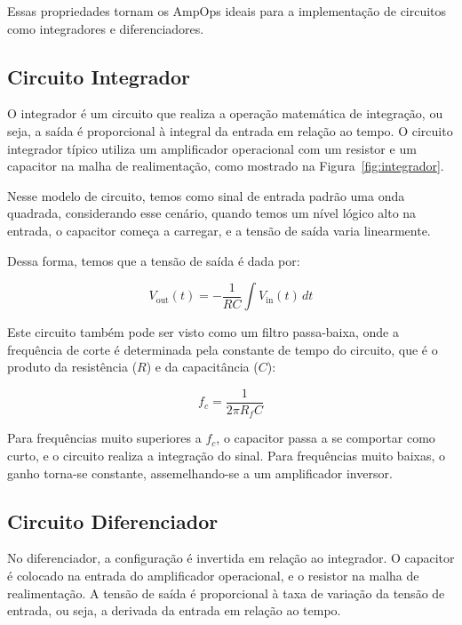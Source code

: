 Essas propriedades tornam os AmpOps ideais para a implementação de circuitos como integradores e diferenciadores.

\subsection{Circuito Integrador}

O integrador é um circuito que realiza a operação matemática de integração, ou seja, a saída é proporcional à integral da entrada em relação ao tempo. O circuito integrador típico utiliza um amplificador operacional com um resistor e um capacitor na malha de realimentação, como mostrado na Figura~\ref{fig:integrador}.

Nesse modelo de circuito, temos como sinal de entrada padrão uma onda quadrada, considerando esse cenário, quando temos um nível lógico alto na entrada, o capacitor começa a carregar, e a tensão de saída varia linearmente.

Dessa forma, temos que a tensão de saída é dada por:

\begin{equation}
    V_{\text{out}}(t) = -\frac{1}{RC} \int V_{\text{in}}(t) \, dt
\end{equation}

Este circuito também pode ser visto como um filtro passa-baixa, onde a frequência de corte é determinada pela constante de tempo do circuito, que é o produto da resistência ($R$) e da capacitância ($C$):

\begin{equation}
    f_c = \frac{1}{2\pi R_{f}C}
\end{equation}

Para frequências muito superiores a $f_c$, o capacitor passa a se comportar como curto, e o circuito realiza a integração do sinal. Para frequências muito baixas, o ganho torna-se constante, assemelhando-se a um amplificador inversor.

\subsection{Circuito Diferenciador}

No diferenciador, a configuração é invertida em relação ao integrador. O capacitor é colocado na entrada do amplificador operacional, e o resistor na malha de realimentação. A tensão de saída é proporcional à taxa de variação da tensão de entrada, ou seja, a derivada da entrada em relação ao tempo.

